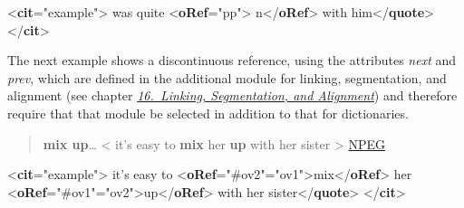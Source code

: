  \par\bgroup{}\exampleFont \begin{shaded}\noindent\mbox{}{<\textbf{cit}\hspace*{1em}{type}="{example}">}\mbox{}\newline 
{}was quite {<\textbf{oRef}\hspace*{1em}{type}="{pp}">}\mbox{}\newline 
\hspace*{1em}\hspace*{1em}n{</\textbf{oRef}>} with him{</\textbf{quote}>}\mbox{}\newline 
{</\textbf{cit}>}\end{shaded}\egroup\par \par
The next example shows a discontinuous reference, using the attributes {\itshape next} and {\itshape prev}, which are defined in the additional module for linking, segmentation, and alignment (see chapter \textit{\hyperref[SA]{16.\ Linking, Segmentation, and Alignment}}) and therefore require that that module be selected in addition to that for dictionaries.
\begin{quote}{\bfseries mix up}… < it's easy to {\bfseries mix} her {\bfseries up} with her sister > \hyperref[DIC-NPEG]{NPEG}\end{quote}
 \par\bgroup{}\exampleFont \begin{shaded}\noindent\mbox{}{<\textbf{cit}\hspace*{1em}{type}="{example}">}\mbox{}\newline 
{}it's easy to {<\textbf{oRef}\hspace*{1em}{next}="{\#ov2}"\hspace*{1em}{xml:id}="{ov1}">}mix{</\textbf{oRef}>} \mbox{}\newline 
\hspace*{1em}\hspace*{1em} her {<\textbf{oRef}\hspace*{1em}{prev}="{\#ov1}"\hspace*{1em}{xml:id}="{ov2}">}up{</\textbf{oRef}>} with her sister{</\textbf{quote}>}\mbox{}\newline 
{</\textbf{cit}>}\end{shaded}\egroup\par \par
